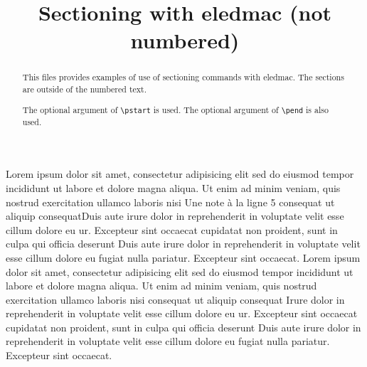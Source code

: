 \documentclass{article}
\begin{document}
\title{Sectioning with eledmac (not numbered)}
\maketitle
\begin{abstract}
This files provides examples of use of sectioning commands with eledmac.
The sections are outside of the numbered text. 

The optional argument of \verb+\pstart+ is used. The optional argument of \verb+\pend+ is also used.
\end{abstract}

\beginnumbering
{}
Lorem ipsum dolor sit amet, consectetur adipisicing elit
sed do eiusmod tempor incididunt ut labore et dolore
magna aliqua. Ut enim ad minim veniam, quis nostrud
exercitation ullamco laboris nisi
Une note à la ligne 5 consequat ut aliquip consequat\pend[\vskip 2ex]
Duis aute irure dolor in reprehenderit
in voluptate velit esse cillum dolore eu ur. Excepteur sint occaecat
cupidatat non proident, sunt in culpa qui officia deserunt
Duis aute irure dolor in reprehenderit
in voluptate velit esse cillum dolore eu fugiat nulla
pariatur. Excepteur sint occaecat.
\pend[]
Lorem ipsum dolor sit amet, consectetur adipisicing elit
sed do eiusmod tempor incididunt ut labore et dolore
magna aliqua. Ut enim ad minim veniam, quis nostrud
exercitation ullamco laboris nisi
 consequat ut aliquip consequat
\pend[\vskip\baselineskip\hspace{0.5\hsize}\hspace{-1em}***]
Irure dolor in reprehenderit
in voluptate velit esse cillum dolore eu ur. Excepteur sint occaecat
cupidatat non proident, sunt in culpa qui officia deserunt
Duis aute irure dolor in reprehenderit
in voluptate velit esse cillum dolore eu fugiat nulla
pariatur. Excepteur sint occaecat.
\pend
\endnumbering
\end{document}
